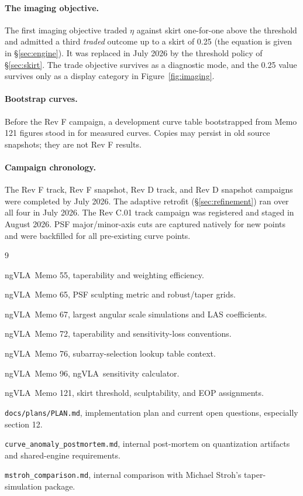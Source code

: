 \documentclass[11pt]{article}
\newcommand{\ngvla}{ngVLA}
\begin{document}
\paragraph{The imaging objective.}  The first imaging objective traded $\eta$
against skirt one-for-one above the threshold and admitted a third
\emph{traded} outcome up to a skirt of 0.25 (the equation is given in
\S\ref{sec:engine}).  It was replaced in July 2026 by the threshold policy
of \S\ref{sec:skirt}.  The trade objective survives as a diagnostic mode,
and the 0.25 value survives only as a display category in
Figure~\ref{fig:imaging}.

\paragraph{Bootstrap curves.}  Before the Rev F campaign, a development curve
table bootstrapped from Memo 121 figures stood in for measured curves.
Copies may persist in old source snapshots; they are not Rev F results.

\paragraph{Campaign chronology.}  The Rev F track, Rev F snapshot, Rev D
track, and Rev D snapshot campaigns were completed by July 2026.  The
adaptive retrofit (\S\ref{sec:refinement}) ran over all four in July 2026.
The Rev C.01 track campaign was registered and staged in August 2026.  PSF
major/minor-axis cuts are captured natively for new points and were
backfilled for all pre-existing curve points.

\begin{thebibliography}{9}

\ngvla\ Memo 55, taperability and weighting efficiency.

\ngvla\ Memo 65, PSF sculpting metric and robust/taper grids.

\ngvla\ Memo 67, largest angular scale simulations and LAS coefficients.

\ngvla\ Memo 72, taperability and sensitivity-loss conventions.

\ngvla\ Memo 76, subarray-selection lookup table context.

\ngvla\ Memo 96, \ngvla\ sensitivity calculator.

\ngvla\ Memo 121, skirt threshold, sculptability, and EOP assignments.

\texttt{docs/plans/PLAN.md}, implementation plan and current open questions, especially
section 12.

\texttt{curve\_anomaly\_postmortem.md}, internal post-mortem on quantization
artifacts and shared-engine requirements.

\texttt{mstroh\_comparison.md}, internal comparison with Michael Stroh's
taper-simulation package.

\end{thebibliography}
\end{document}
